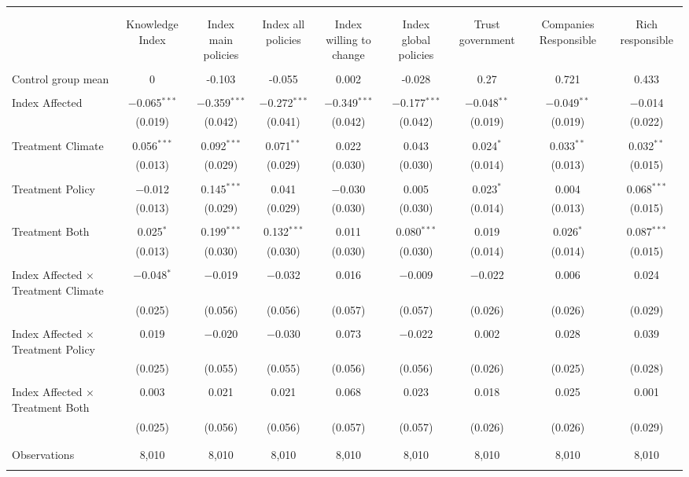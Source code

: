 
\begin{tabular}{@{\extracolsep{5pt}}lcccccccc} 
\\[-1.8ex]\hline 
\hline \\[-1.8ex] 
\\[-1.8ex] & Knowledge Index & Index main policies & Index all policies & Index willing to change & Index global policies & Trust government & Companies Responsible & Rich responsible \\ 
\hline \\[-1.8ex] 
 Control group mean & 0 & -0.103 & -0.055 & 0.002 & -0.028 & 0.27 & 0.721 & 0.433  \\ \hline \\[-1.8ex] Index Affected & $-$0.065$^{***}$ & $-$0.359$^{***}$ & $-$0.272$^{***}$ & $-$0.349$^{***}$ & $-$0.177$^{***}$ & $-$0.048$^{**}$ & $-$0.049$^{**}$ & $-$0.014 \\ 
  & (0.019) & (0.042) & (0.041) & (0.042) & (0.042) & (0.019) & (0.019) & (0.022) \\ 
  & & & & & & & & \\ 
 Treatment Climate & 0.056$^{***}$ & 0.092$^{***}$ & 0.071$^{**}$ & 0.022 & 0.043 & 0.024$^{*}$ & 0.033$^{**}$ & 0.032$^{**}$ \\ 
  & (0.013) & (0.029) & (0.029) & (0.030) & (0.030) & (0.014) & (0.013) & (0.015) \\ 
  & & & & & & & & \\ 
 Treatment Policy & $-$0.012 & 0.145$^{***}$ & 0.041 & $-$0.030 & 0.005 & 0.023$^{*}$ & 0.004 & 0.068$^{***}$ \\ 
  & (0.013) & (0.029) & (0.029) & (0.030) & (0.030) & (0.014) & (0.013) & (0.015) \\ 
  & & & & & & & & \\ 
 Treatment Both & 0.025$^{*}$ & 0.199$^{***}$ & 0.132$^{***}$ & 0.011 & 0.080$^{***}$ & 0.019 & 0.026$^{*}$ & 0.087$^{***}$ \\ 
  & (0.013) & (0.030) & (0.030) & (0.030) & (0.030) & (0.014) & (0.014) & (0.015) \\ 
  & & & & & & & & \\ 
 Index Affected $\times$ Treatment Climate & $-$0.048$^{*}$ & $-$0.019 & $-$0.032 & 0.016 & $-$0.009 & $-$0.022 & 0.006 & 0.024 \\ 
  & (0.025) & (0.056) & (0.056) & (0.057) & (0.057) & (0.026) & (0.026) & (0.029) \\ 
  & & & & & & & & \\ 
 Index Affected $\times$ Treatment Policy & 0.019 & $-$0.020 & $-$0.030 & 0.073 & $-$0.022 & 0.002 & 0.028 & 0.039 \\ 
  & (0.025) & (0.055) & (0.055) & (0.056) & (0.056) & (0.026) & (0.025) & (0.028) \\ 
  & & & & & & & & \\ 
 Index Affected $\times$ Treatment Both & 0.003 & 0.021 & 0.021 & 0.068 & 0.023 & 0.018 & 0.025 & 0.001 \\ 
  & (0.025) & (0.056) & (0.056) & (0.057) & (0.057) & (0.026) & (0.026) & (0.029) \\ 
  & & & & & & & & \\ 
\hline \\[-1.8ex] 

Observations & 8,010 & 8,010 & 8,010 & 8,010 & 8,010 & 8,010 & 8,010 & 8,010 \\ 
\hline 
\hline \\[-1.8ex] 
\end{tabular} 